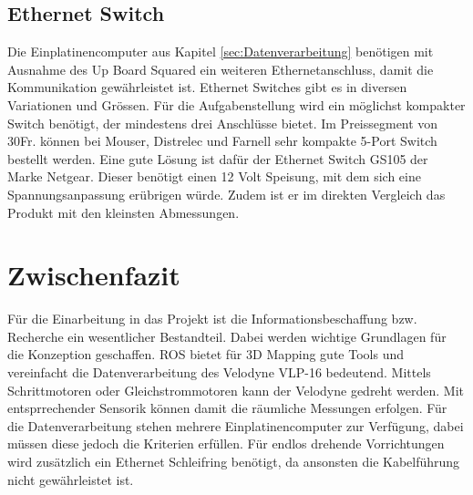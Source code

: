 \subsection{Ethernet Switch}
\label{subsec:Ethernetswitch}
Die Einplatinencomputer aus Kapitel \ref{sec:Datenverarbeitung} benötigen mit Ausnahme des Up Board Squared ein weiteren Ethernetanschluss, damit die Kommunikation gewährleistet ist. Ethernet Switches gibt es in diversen Variationen und Grössen. Für die Aufgabenstellung wird ein möglichst kompakter Switch benötigt, der mindestens drei Anschlüsse bietet. Im Preissegment von 30Fr. können bei Mouser, Distrelec und Farnell sehr kompakte 5-Port Switch bestellt werden. Eine gute Lösung ist dafür der Ethernet Switch GS105 der Marke Netgear. Dieser benötigt einen 12 Volt Speisung, mit dem sich eine Spannungsanpassung erübrigen würde. Zudem ist er im direkten Vergleich das Produkt mit den kleinsten Abmessungen.

\section{Zwischenfazit}
\label{ZwischenfazitInfo}
Für die Einarbeitung in das Projekt ist die Informationsbeschaffung bzw. Recherche ein wesentlicher Bestandteil. Dabei werden wichtige Grundlagen für die Konzeption geschaffen. ROS bietet für 3D Mapping gute Tools und vereinfacht die Datenverarbeitung des Velodyne VLP-16 bedeutend. Mittels Schrittmotoren oder Gleichstrommotoren kann der Velodyne gedreht werden. Mit entsprrechender Sensorik können damit die räumliche Messungen erfolgen. Für die Datenverarbeitung stehen mehrere Einplatinencomputer zur Verfügung, dabei müssen diese jedoch die Kriterien erfüllen. Für endlos drehende Vorrichtungen wird zusätzlich ein Ethernet Schleifring benötigt, da ansonsten die Kabelführung nicht gewährleistet ist.  

